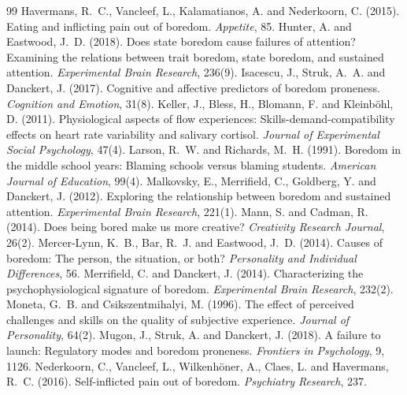 \documentclass{situationist-preprint}
\begin{document}
\begin{thebibliography}{99}
 Havermans, R.~C., Vancleef, L., Kalamatianos, A. and Nederkoorn, C. (2015). Eating and inflicting pain out of boredom. \emph{Appetite}, 85.
 Hunter, A. and Eastwood, J.~D. (2018). Does state boredom cause failures of attention? Examining the relations between trait boredom, state boredom, and sustained attention. \emph{Experimental Brain Research}, 236(9).
 Isacescu, J., Struk, A.~A. and Danckert, J. (2017). Cognitive and affective predictors of boredom proneness. \emph{Cognition and Emotion}, 31(8).
 Keller, J., Bless, H., Blomann, F. and Kleinb{\"o}hl, D. (2011). Physiological aspects of flow experiences: Skills-demand-compatibility effects on heart rate variability and salivary cortisol. \emph{Journal of Experimental Social Psychology}, 47(4).
 Larson, R.~W. and Richards, M.~H. (1991). Boredom in the middle school years: Blaming schools versus blaming students. \emph{American Journal of Education}, 99(4).
 Malkovsky, E., Merrifield, C., Goldberg, Y. and Danckert, J. (2012). Exploring the relationship between boredom and sustained attention. \emph{Experimental Brain Research}, 221(1).
 Mann, S. and Cadman, R. (2014). Does being bored make us more creative? \emph{Creativity Research Journal}, 26(2).
 Mercer-Lynn, K.~B., Bar, R.~J. and Eastwood, J.~D. (2014). Causes of boredom: The person, the situation, or both? \emph{Personality and Individual Differences}, 56.
 Merrifield, C. and Danckert, J. (2014). Characterizing the psychophysiological signature of boredom. \emph{Experimental Brain Research}, 232(2).
 Moneta, G.~B. and Csikszentmihalyi, M. (1996). The effect of perceived challenges and skills on the quality of subjective experience. \emph{Journal of Personality}, 64(2).
 Mugon, J., Struk, A. and Danckert, J. (2018). A failure to launch: Regulatory modes and boredom proneness. \emph{Frontiers in Psychology}, 9, 1126.
 Nederkoorn, C., Vancleef, L., Wilkenh{\"o}ner, A., Claes, L. and Havermans, R.~C. (2016). Self-inflicted pain out of boredom. \emph{Psychiatry Research}, 237.

\end{thebibliography}
\end{document}
